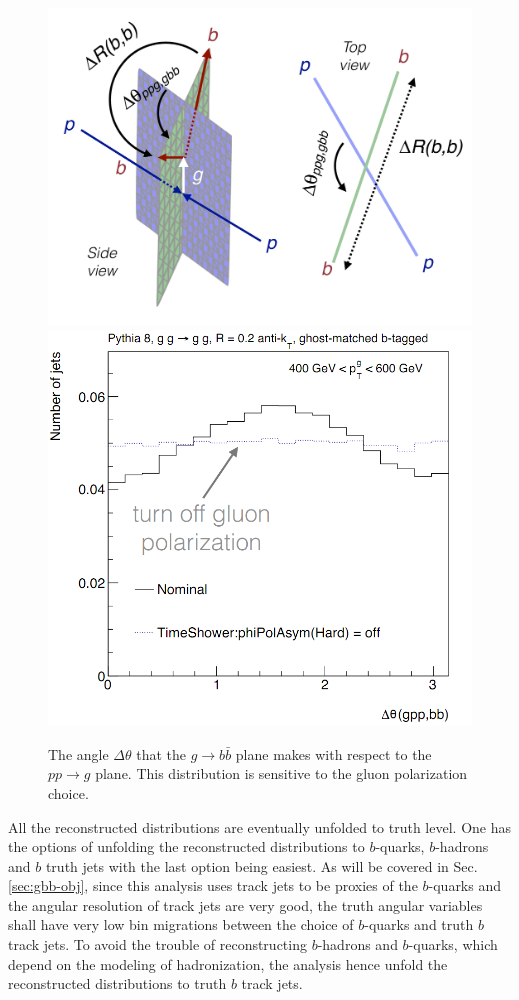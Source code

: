 
\begin{figure}[htpb!]
\begin{center}
\includegraphics[width=0.45\linewidth]{figures/gbb/schematic.pdf}
\includegraphics[width=0.45\linewidth]{figures/gbb/dtheta.png}
\caption{The angle $\Delta \theta$ that the $g\rightarrow b\bar{b}$ plane makes with respect to the $pp\rightarrow g$ plane. This distribution is sensitive to the gluon polarization choice.} 
\label{fig:gbb-gbbangle}
\end{center}
\end{figure}


All the reconstructed distributions are eventually unfolded to truth level. One has the options of unfolding the reconstructed distributions to $b$-quarks, $b$-hadrons and $b$ truth jets with the last option being easiest. As will be covered in Sec.\ref{sec:gbb-obj}, since this analysis uses track jets to be proxies of the $b$-quarks and the angular resolution of track jets are very good, the truth angular variables shall have very low bin migrations between the choice of $b$-quarks and truth $b$ track jets. To avoid the trouble of reconstructing $b$-hadrons and $b$-quarks, which depend on the modeling of hadronization, the analysis hence unfold the reconstructed distributions to truth $b$ track jets. 
